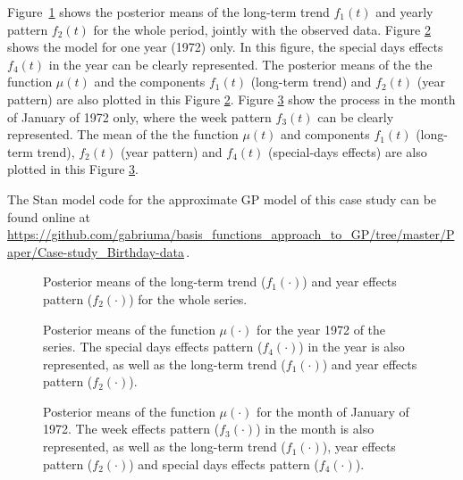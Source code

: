 Figure~\ref{fig15_posteriors_birthday} shows the posterior means of the long-term trend $f_1(t)$ and yearly pattern $f_2(t)$ for the whole period, jointly with the observed data. Figure \ref{fig16_posteriors_oneyear_birthday} shows the model for one year (1972) only. In this figure, the special days effects $f_4(t)$ in the year can be clearly represented. The posterior means of the the function $\mu(t)$ and the components $f_1(t)$ (long-term trend) and $f_2(t)$ (year pattern) are also plotted in this Figure \ref{fig16_posteriors_oneyear_birthday}. Figure \ref{fig17_posteriors_onemonth_birthday} show the process in the month of January of 1972 only, where the week pattern $f_3(t)$ can be clearly represented. The mean of the the function $\mu(t)$ and components $f_1(t)$ (long-term trend), $f_2(t)$ (year pattern) and $f_4(t)$ (special-days effects) are also plotted in this Figure \ref{fig17_posteriors_onemonth_birthday}. 

The Stan model code for the approximate GP model of this case study can be found online at {\small \url{https://github.com/gabriuma/basis_functions_approach_to_GP/tree/master/Paper/Case-study_Birthday-data}}\,.

\begin{figure}
\centering
{}
\caption{Posterior means of the long-term trend ($f_1(\cdot)$) and year effects pattern ($f_2(\cdot)$) for the whole series. }
  \label{fig15_posteriors_birthday}
\end{figure}

\begin{figure}[!t]
\centering
{}
\caption{Posterior means of the function $\mu(\cdot)$ for the year 1972 of the series. The special days effects pattern ($f_4(\cdot)$) in the year is also represented, as well as the long-term trend ($f_1(\cdot)$) and year effects pattern ($f_2(\cdot)$). }
  \label{fig16_posteriors_oneyear_birthday}
\end{figure}

\begin{figure}[!h]
\centering
{}
\caption{Posterior means of the function $\mu(\cdot)$ for the month of January of 1972. The week effects pattern ($f_3(\cdot)$) in the month is also represented, as well as the long-term trend ($f_1(\cdot)$), year effects pattern ($f_2(\cdot)$) and special days effects pattern ($f_4(\cdot)$). }
  \label{fig17_posteriors_onemonth_birthday}
\end{figure}

